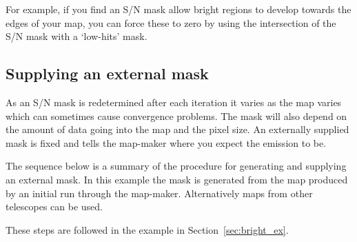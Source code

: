 \documentclass[twoside,11pt]{article}
\newcommand{\htmlref}[2]{#1}
\newcommand{\latexhtml}[2]{#1}
\newcommand{\xlabel}[1]{}
\renewcommand{\_}{\texttt{\symbol{95}}}
\newcommand{\cref}[3]{\latexhtml{#1~\ref{#2}}{\htmlref{#3}{#2}}}
\begin{document}
For example, if you find an S/N mask allow bright regions to develop
towards the edges of your map, you can force these to zero by using
the intersection of the S/N mask with a `low-hits' mask.

\subsection{\xlabel{maskbe}Supplying an external mask}
\label{sec:maskbe}

As an S/N mask is redetermined after each iteration it varies as the
map varies which can sometimes cause convergence problems. The mask
will also depend on the amount of data going into the map and the
pixel size. An externally supplied mask is fixed and tells the
map-maker where you expect the emission to be.

The sequence below is a summary of the procedure for generating and
supplying an external mask. In this example the mask is generated from
the map produced by an initial run through the map-maker.
Alternatively maps from other telescopes can be used.

These steps are followed in the example in
\cref{Section}{sec:bright_ex}{Extended galactic sources}.
\end{document}
